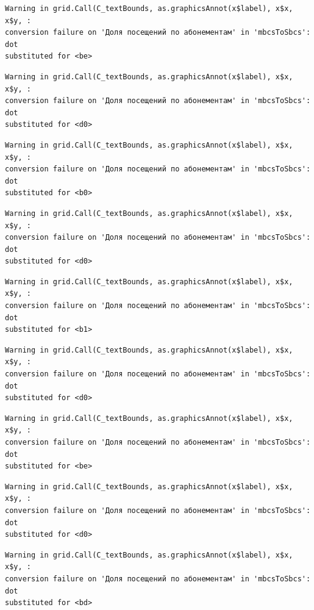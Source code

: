 \documentclass[
  letterpaper,
  DIV=11,
  numbers=noendperiod]{scrartcl}
\begin{document}
\begin{verbatim}
Warning in grid.Call(C_textBounds, as.graphicsAnnot(x$label), x$x, x$y, :
conversion failure on 'Доля посещений по абонементам' in 'mbcsToSbcs': dot
substituted for <be>
\end{verbatim}

\begin{verbatim}
Warning in grid.Call(C_textBounds, as.graphicsAnnot(x$label), x$x, x$y, :
conversion failure on 'Доля посещений по абонементам' in 'mbcsToSbcs': dot
substituted for <d0>
\end{verbatim}

\begin{verbatim}
Warning in grid.Call(C_textBounds, as.graphicsAnnot(x$label), x$x, x$y, :
conversion failure on 'Доля посещений по абонементам' in 'mbcsToSbcs': dot
substituted for <b0>
\end{verbatim}

\begin{verbatim}
Warning in grid.Call(C_textBounds, as.graphicsAnnot(x$label), x$x, x$y, :
conversion failure on 'Доля посещений по абонементам' in 'mbcsToSbcs': dot
substituted for <d0>
\end{verbatim}

\begin{verbatim}
Warning in grid.Call(C_textBounds, as.graphicsAnnot(x$label), x$x, x$y, :
conversion failure on 'Доля посещений по абонементам' in 'mbcsToSbcs': dot
substituted for <b1>
\end{verbatim}

\begin{verbatim}
Warning in grid.Call(C_textBounds, as.graphicsAnnot(x$label), x$x, x$y, :
conversion failure on 'Доля посещений по абонементам' in 'mbcsToSbcs': dot
substituted for <d0>
\end{verbatim}

\begin{verbatim}
Warning in grid.Call(C_textBounds, as.graphicsAnnot(x$label), x$x, x$y, :
conversion failure on 'Доля посещений по абонементам' in 'mbcsToSbcs': dot
substituted for <be>
\end{verbatim}

\begin{verbatim}
Warning in grid.Call(C_textBounds, as.graphicsAnnot(x$label), x$x, x$y, :
conversion failure on 'Доля посещений по абонементам' in 'mbcsToSbcs': dot
substituted for <d0>
\end{verbatim}

\begin{verbatim}
Warning in grid.Call(C_textBounds, as.graphicsAnnot(x$label), x$x, x$y, :
conversion failure on 'Доля посещений по абонементам' in 'mbcsToSbcs': dot
substituted for <bd>
\end{verbatim}
\end{document}
